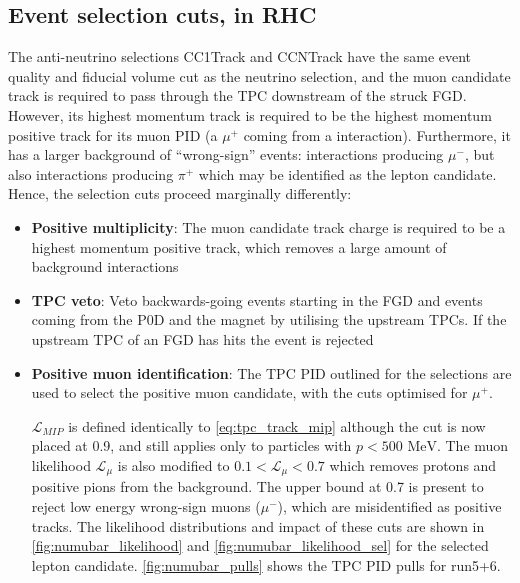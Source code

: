 \subsection{Event selection cuts, \numubar in RHC}
\label{sec:numubar_sel}
The anti-neutrino selections CC1Track and CCNTrack have the same event quality and fiducial volume cut as the neutrino selection, and the muon candidate track is required to pass through the TPC downstream of the struck FGD. However, its highest momentum track is required to be the highest momentum positive track for its muon PID (a $\mu^+$ coming from a \numubar interaction). Furthermore, it has a larger background of ``wrong-sign'' events: \numu interactions producing $\mu^-$, but also \numu interactions producing $\pi^+$ which may be identified as the lepton candidate. Hence, the selection cuts proceed marginally differently:
\begin{itemize}
	\item \textbf{Positive multiplicity}: The muon candidate track charge is required to be a highest momentum positive track, which removes a large amount of \numu background interactions
	
	\item \textbf{TPC veto}: Veto backwards-going events starting in the FGD and events coming from the P0D and the magnet by utilising the upstream TPCs. If the upstream TPC of an FGD has hits the event is rejected
	
	\item \textbf{Positive muon identification}: The TPC PID outlined for the \numu selections are used to select the positive muon candidate, with the cuts optimised for $\mu^+$. 
	
	$\mathcal{L}_{MIP}$ is defined identically to \autoref{eq:tpc_track_mip} although the cut is now placed at 0.9, and still applies only to particles with $p < 500\text{ MeV}$. The muon likelihood $\mathcal{L}_\mu$ is also modified to $0.1 < \mathcal{L}_\mu < 0.7$ which removes protons and positive pions from the \numu background. The upper bound at 0.7 is present to reject low energy wrong-sign muons ($\mu^-$), which are misidentified as positive tracks. The likelihood distributions and impact of these cuts are shown in \autoref{fig:numubar_likelihood} and \autoref{fig:numubar_likelihood_sel} for the selected lepton candidate. \autoref{fig:numubar_pulls} shows the TPC PID pulls for run5+6.
\end{itemize}

